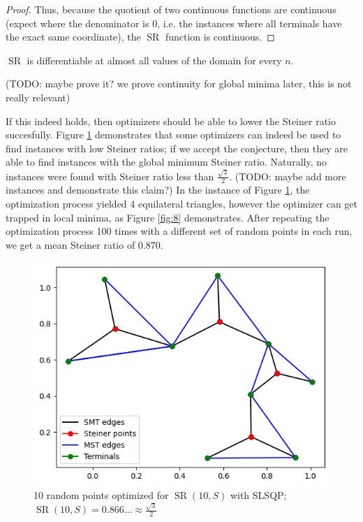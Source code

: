 \documentclass{mpaper}
\begin{document}
\begin{proof}
  Thus, because the quotient of two continuous functions are continuous (expect where the denominator is 0, i.e. the instances where all terminals have the exact same coordinate), the $\operatorname{SR}$ function is continuous.

\end{proof}

\begin{conjecture}
  $\operatorname{SR}$ is differentiable at almost all values of the domain for every $n$.
\end{conjecture}

(TODO: maybe prove it? we prove continuity for global minima later, this is not really relevant) 

If this indeed holds, then optimizers should be able to lower the Steiner ratio succesfully. Figure \ref{fig:7} demonstrates that some optimizers can indeed be used to find instances with low Steiner ratios; if we accept the conjecture, then they are able to find instances with the global minimum Steiner ratio. Naturally, no instances were found with Steiner ratio less than $\frac{\sqrt{3}}{2}$. (TODO: maybe add more instances and demonstrate this claim?) In the instance of Figure \ref{fig:7}, the optimization process yielded 4 equilateral triangles, however the optimizer can get trapped in local minima, as Figure \ref{fig:8} demonstrates. After repeating the optimization process 100 times with a different set of random points in each run, we get a mean Steiner ratio of 0.870.


\begin{figure}
  \begin{center}
  \includegraphics[scale=0.5]{plot7.png}
  \end{center}
  \caption{\label{fig:7}10 random points optimized for $\operatorname{SR}(10, S)$ with SLSQP; $\operatorname{SR}(10, S)=0.866\dots\approx\frac{\sqrt{3}}{2}$}
\end{figure}
\end{document}
